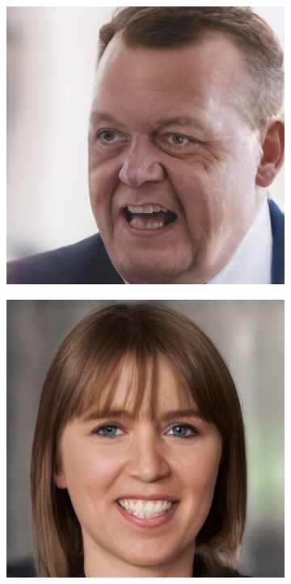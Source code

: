 \begin{figure}[h!]
\begin{subfigure}[b]{0.24\textwidth}
    \end{subfigure}
    \begin{subfigure}[b]{0.24\textwidth}
        \includegraphics[width=\textwidth]{fig/stylegan/faceedit/lars-smile}

    \end{subfigure}
    \begin{subfigure}[b]{0.24\textwidth}
        \includegraphics[width=\textwidth]{fig/stylegan/faceedit/mette-smile}


\end{subfigure}
\end{figure}
